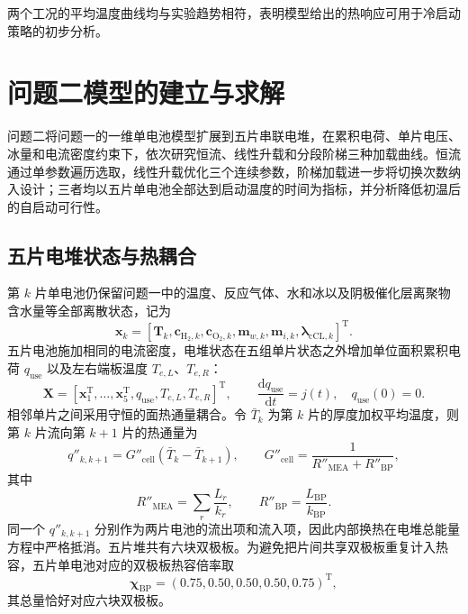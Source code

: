 \documentclass{gmcmthesis}
\begin{document}
两个工况的平均温度曲线均与实验趋势相符，表明模型给出的热响应可用于冷启动策略的初步分析。

\section{问题二模型的建立与求解}
\label{sec:model2}

问题二将问题一的一维单电池模型扩展到五片串联电堆，在累积电荷、单片电压、冰量和电流密度约束下，依次研究恒流、线性升载和分段阶梯三种加载曲线。恒流通过单参数遍历选取，线性升载优化三个连续参数，阶梯加载进一步将切换次数纳入设计；三者均以五片单电池全部达到启动温度的时间为指标，并分析降低初温后的自启动可行性。

\subsection{五片电堆状态与热耦合}

第 $k$ 片单电池仍保留问题一中的温度、反应气体、水和冰以及阴极催化层离聚物含水量等全部离散状态，记为
\begin{equation}
  \bm{x}_k=
  \left[\bm{T}_k,\bm{c}_{\mathrm{H_2},k},
  \bm{c}_{\mathrm{O_2},k},\bm{m}_{w,k},
  \bm{m}_{i,k},\bm{\lambda}_{\mathrm{cCL},k}\right]^{\mathrm T}.
\end{equation}
五片电池施加相同的电流密度，电堆状态在五组单片状态之外增加单位面积累积电荷 $q_{\mathrm{use}}$ 以及左右端板温度 $T_{e,L}$、$T_{e,R}$：
\begin{equation}
  \bm{X}=\left[\bm{x}_1^{\mathrm T},\ldots,\bm{x}_5^{\mathrm T},
  q_{\mathrm{use}},T_{e,L},T_{e,R}\right]^{\mathrm T},
  \qquad
  \frac{\mathrm d q_{\mathrm{use}}}{\mathrm dt}=j(t),
  \quad q_{\mathrm{use}}(0)=0.
  \label{eq:q2-charge}
\end{equation}
相邻单片之间采用守恒的面热通量耦合。令 $\bar T_k$ 为第 $k$ 片的厚度加权平均温度，则第 $k$ 片流向第 $k+1$ 片的热通量为
\begin{equation}
  q''_{k,k+1}=G''_{\mathrm{cell}}(\bar T_k-\bar T_{k+1}),
  \qquad
  G''_{\mathrm{cell}}=\frac{1}{R''_{\mathrm{MEA}}+R''_{\mathrm{BP}}},
  \label{eq:q2-intercell-heat}
\end{equation}
其中
\begin{equation}
  R''_{\mathrm{MEA}}=\sum_{r}\frac{L_r}{k_r},
  \qquad
  R''_{\mathrm{BP}}=\frac{L_{\mathrm{BP}}}{k_{\mathrm{BP}}}.
\end{equation}
同一个 $q''_{k,k+1}$ 分别作为两片电池的流出项和流入项，因此内部换热在电堆总能量方程中严格抵消。五片堆共有六块双极板。为避免把片间共享双极板重复计入热容，五片单电池对应的双极板热容倍率取
\begin{equation}
  \bm{\chi}_{\mathrm{BP}}=(0.75,0.50,0.50,0.50,0.75)^{\mathrm T},
\end{equation}
其总量恰好对应六块双极板。
\end{document}
